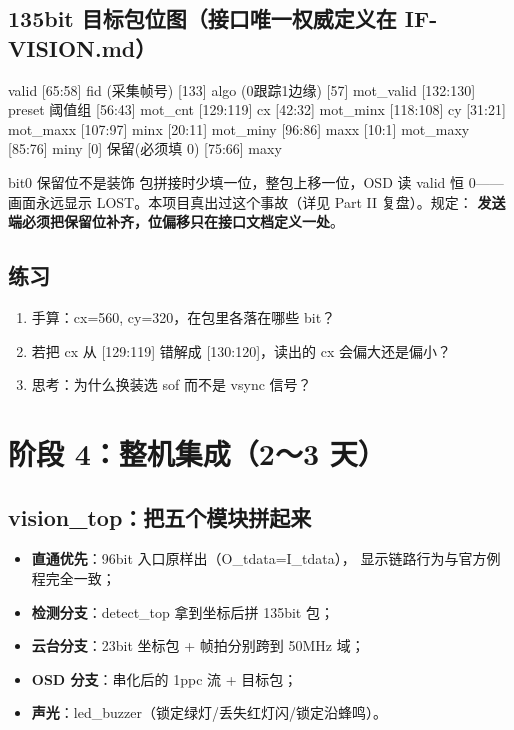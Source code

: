 \documentclass[11pt]{ctexart}
\begin{document}
\subsection{135bit 目标包位图（接口唯一权威定义在 IF-VISION.md）}

\begin{Verilog}
[134]    valid          [65:58]  fid (采集帧号)
[133]    algo (0跟踪1边缘) [57]    mot_valid
[132:130] preset 阈值组   [56:43]  mot_cnt
[129:119] cx             [42:32]  mot_minx
[118:108] cy             [31:21]  mot_maxx
[107:97]  minx           [20:11]  mot_miny
[96:86]   maxx           [10:1]   mot_maxy
[85:76]   miny           [0]      保留(必须填 0)
[75:66]   maxy
\end{Verilog}

\begin{warnbox}{bit0 保留位不是装饰}
包拼接时少填一位，整包上移一位，OSD 读 valid 恒 0——画面永远显示
LOST。本项目真出过这个事故（详见 Part II 复盘）。规定：
\textbf{发送端必须把保留位补齐，位偏移只在接口文档定义一处}。
\end{warnbox}

\subsection{练习}

\begin{enumerate}
  \item 手算：cx=560, cy=320，在包里各落在哪些 bit？
  \item 若把 cx 从 [129:119] 错解成 [130:120]，读出的 cx 会偏大还是偏小？
  \item 思考：为什么换装选 sof 而不是 vsync 信号？
\end{enumerate}

\section{阶段 4：整机集成（2～3 天）}

\subsection{vision\_top：把五个模块拼起来}

\begin{itemize}
  \item \textbf{直通优先}：96bit 入口原样出（O\_tdata=I\_tdata），
    显示链路行为与官方例程完全一致；
  \item \textbf{检测分支}：detect\_top 拿到坐标后拼 135bit 包；
  \item \textbf{云台分支}：23bit 坐标包 + 帧拍分别跨到 50MHz 域；
  \item \textbf{OSD 分支}：串化后的 1ppc 流 + 目标包；
  \item \textbf{声光}：led\_buzzer（锁定绿灯/丢失红灯闪/锁定沿蜂鸣）。
\end{itemize}
\end{document}
